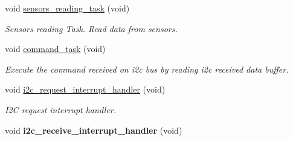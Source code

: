 \begin{DoxyCompactItemize}
void \hyperlink{i2c-th_8h_af0e8965583b124096972fe3a9e0e7954}{sensors\+\_\+reading\+\_\+task} (void)
\begin{DoxyCompactList}\small\item\em Sensors reading Task. Read data from sensors. \end{DoxyCompactList}\item 
void \hyperlink{i2c-th_8h_a9f32a4169471a435e9364460d7b1761d}{command\+\_\+task} (void)
\begin{DoxyCompactList}\small\item\em Execute the command received on i2c bus by reading i2c received data buffer. \end{DoxyCompactList}\item 
void \hyperlink{i2c-th_8h_ac1da31566bf05976ecb87372278a1ea8}{i2c\+\_\+request\+\_\+interrupt\+\_\+handler} (void)
\begin{DoxyCompactList}\small\item\em I2C request interrupt handler. \end{DoxyCompactList}\item 
\mbox{\label{i2c-th_8h_a7f81fcf39717baf18f2e7c2eee2051ae}} 
void {\bfseries i2c\+\_\+receive\+\_\+interrupt\+\_\+handler} (void)
\end{DoxyCompactItemize}

